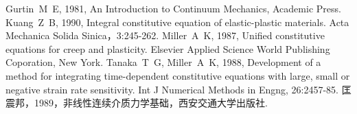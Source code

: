 \documentclass[a4paper]{cctart}
\numberwithin{equation}{section} \pagestyle{fancy}
\begin{document}
\begin{thebibliography}{9}
Gurtin~M~E, 1981, An Introduction to Continuum
Mechanics, Academic Press.
Kuang~Z~B, 1990, Integral constitutive equation
of elastic-plastic materials. Acta Mechanica Solida
Sinica，3:245-262.
Miller~A~K, 1987, Unified constitutive equations
for creep and plasticity. Elsevier Applied Science World
Publishing Coporation, New York.
Tanaka~T~G, Miller~A~K, 1988, Development of a
method for integrating time-dependent constitutive equations with
large, small or negative strain rate sensitivity. Int J Numerical
Methods in Engng, 26:2457-85.
 匡震邦，1989，非线性连续介质力学基础，西安交通大学出版社.
\end{thebibliography}
\end{document}
